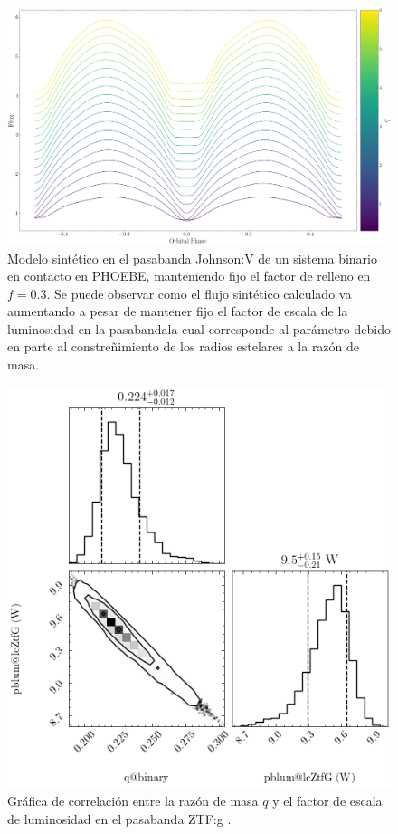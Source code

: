 \begin{figure}[!ht]
    \centering
    \includegraphics[scale=0.37]{Conclusion/Figures/Figura q-Luminosidad Relacion.png}
    \caption{Modelo sintético en el pasabanda Johnson:V de un sistema binario en
    contacto en PHOEBE, manteniendo fijo el factor de relleno en $f = 0.3$. Se
    puede observar como el flujo sintético calculado va aumentando a pesar de
    mantener fijo el factor de escala de la luminosidad en la
    pasabanda\textemdash la cual corresponde al parámetro
    \textemdash debido en parte al constreñimiento de los radios
    estelares a la razón de masa.}
    \label{figuraRazonMasaLuminosidadSintetico}
\end{figure}

\begin{figure}[!ht]
    \centering
    \includegraphics[scale=0.8]{Conclusion/Figures/Figura q-Luminosidad PDF Correlacion.png}
    \caption{Gráfica de correlación entre la razón de masa $q$ y el factor de
    escala de luminosidad en el pasabanda ZTF:g .}
    \label{figuraQ_LuminosidadPdfCorrelacion}
\end{figure}

